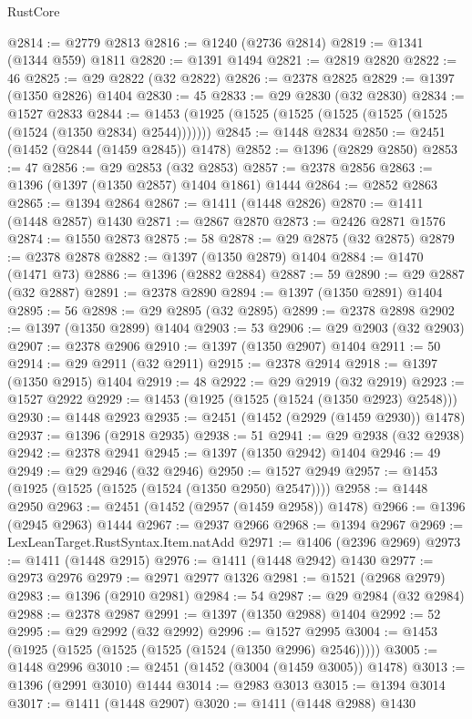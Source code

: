 \begin{lexlean}{RustCore}
\begin{coremodule}
@2814 := @2779 @2813
@2816 := @1240 (@2736 @2814)
@2819 := @1341 (@1344 @559) @1811
@2820 := @1391 @1494
@2821 := @2819 @2820
@2822 := 46
@2825 := @29 @2822 (@32 @2822)
@2826 := @2378 @2825
@2829 := @1397 (@1350 @2826) @1404
@2830 := 45
@2833 := @29 @2830 (@32 @2830)
@2834 := @1527 @2833
@2844 := @1453 (@1925 (@1525 (@1525 (@1525 (@1525 (@1525 (@1524 (@1350 @2834) @2544)))))))
@2845 := @1448 @2834
@2850 := @2451 (@1452 (@2844 (@1459 @2845)) @1478)
@2852 := @1396 (@2829 @2850)
@2853 := 47
@2856 := @29 @2853 (@32 @2853)
@2857 := @2378 @2856
@2863 := @1396 (@1397 (@1350 @2857) @1404 @1861) @1444
@2864 := @2852 @2863
@2865 := @1394 @2864
@2867 := @1411 (@1448 @2826)
@2870 := @1411 (@1448 @2857) @1430
@2871 := @2867 @2870
@2873 := @2426 @2871 @1576
@2874 := @1550 @2873
@2875 := 58
@2878 := @29 @2875 (@32 @2875)
@2879 := @2378 @2878
@2882 := @1397 (@1350 @2879) @1404
@2884 := @1470 (@1471 @73)
@2886 := @1396 (@2882 @2884)
@2887 := 59
@2890 := @29 @2887 (@32 @2887)
@2891 := @2378 @2890
@2894 := @1397 (@1350 @2891) @1404
@2895 := 56
@2898 := @29 @2895 (@32 @2895)
@2899 := @2378 @2898
@2902 := @1397 (@1350 @2899) @1404
@2903 := 53
@2906 := @29 @2903 (@32 @2903)
@2907 := @2378 @2906
@2910 := @1397 (@1350 @2907) @1404
@2911 := 50
@2914 := @29 @2911 (@32 @2911)
@2915 := @2378 @2914
@2918 := @1397 (@1350 @2915) @1404
@2919 := 48
@2922 := @29 @2919 (@32 @2919)
@2923 := @1527 @2922
@2929 := @1453 (@1925 (@1525 (@1524 (@1350 @2923) @2548)))
@2930 := @1448 @2923
@2935 := @2451 (@1452 (@2929 (@1459 @2930)) @1478)
@2937 := @1396 (@2918 @2935)
@2938 := 51
@2941 := @29 @2938 (@32 @2938)
@2942 := @2378 @2941
@2945 := @1397 (@1350 @2942) @1404
@2946 := 49
@2949 := @29 @2946 (@32 @2946)
@2950 := @1527 @2949
@2957 := @1453 (@1925 (@1525 (@1525 (@1524 (@1350 @2950) @2547))))
@2958 := @1448 @2950
@2963 := @2451 (@1452 (@2957 (@1459 @2958)) @1478)
@2966 := @1396 (@2945 @2963) @1444
@2967 := @2937 @2966
@2968 := @1394 @2967
@2969 := LexLeanTarget.RustSyntax.Item.natAdd
@2971 := @1406 (@2396 @2969)
@2973 := @1411 (@1448 @2915)
@2976 := @1411 (@1448 @2942) @1430
@2977 := @2973 @2976
@2979 := @2971 @2977 @1326
@2981 := @1521 (@2968 @2979)
@2983 := @1396 (@2910 @2981)
@2984 := 54
@2987 := @29 @2984 (@32 @2984)
@2988 := @2378 @2987
@2991 := @1397 (@1350 @2988) @1404
@2992 := 52
@2995 := @29 @2992 (@32 @2992)
@2996 := @1527 @2995
@3004 := @1453 (@1925 (@1525 (@1525 (@1525 (@1524 (@1350 @2996) @2546)))))
@3005 := @1448 @2996
@3010 := @2451 (@1452 (@3004 (@1459 @3005)) @1478)
@3013 := @1396 (@2991 @3010) @1444
@3014 := @2983 @3013
@3015 := @1394 @3014
@3017 := @1411 (@1448 @2907)
@3020 := @1411 (@1448 @2988) @1430

\end{coremodule}
\end{lexlean}
